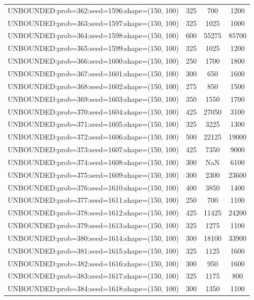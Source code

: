 \begin{longtable}{lccc}
UNBOUNDED:prob=362:seed=1596:shape=(150, 100) &      325 &   700 &   1200 \\
UNBOUNDED:prob=363:seed=1597:shape=(150, 100) &      325 &  1025 &   1000 \\
UNBOUNDED:prob=364:seed=1598:shape=(150, 100) &      600 & 55275 &  85700 \\
UNBOUNDED:prob=365:seed=1599:shape=(150, 100) &      325 &  1025 &   1200 \\
UNBOUNDED:prob=366:seed=1600:shape=(150, 100) &      250 &  1700 &   1800 \\
UNBOUNDED:prob=367:seed=1601:shape=(150, 100) &      300 &   650 &   1600 \\
UNBOUNDED:prob=368:seed=1602:shape=(150, 100) &      275 &   850 &   1500 \\
UNBOUNDED:prob=369:seed=1603:shape=(150, 100) &      350 &  1550 &   1700 \\
UNBOUNDED:prob=370:seed=1604:shape=(150, 100) &      425 & 27050 &   3100 \\
UNBOUNDED:prob=371:seed=1605:shape=(150, 100) &      325 &  3225 &   1300 \\
UNBOUNDED:prob=372:seed=1606:shape=(150, 100) &      500 & 22125 &  19000 \\
UNBOUNDED:prob=373:seed=1607:shape=(150, 100) &      425 &  7350 &   9000 \\
UNBOUNDED:prob=374:seed=1608:shape=(150, 100) &      300 &   NaN &   6100 \\
UNBOUNDED:prob=375:seed=1609:shape=(150, 100) &      300 &  2300 &  23600 \\
UNBOUNDED:prob=376:seed=1610:shape=(150, 100) &      400 &  3850 &   1400 \\
UNBOUNDED:prob=377:seed=1611:shape=(150, 100) &      250 &   700 &   1100 \\
UNBOUNDED:prob=378:seed=1612:shape=(150, 100) &      425 & 11425 &  24200 \\
UNBOUNDED:prob=379:seed=1613:shape=(150, 100) &      325 &  1275 &   1100 \\
UNBOUNDED:prob=380:seed=1614:shape=(150, 100) &      300 & 18100 &  33900 \\
UNBOUNDED:prob=381:seed=1615:shape=(150, 100) &      325 &  1125 &   1600 \\
UNBOUNDED:prob=382:seed=1616:shape=(150, 100) &      300 &   950 &   1600 \\
UNBOUNDED:prob=383:seed=1617:shape=(150, 100) &      325 &  1175 &    800 \\
UNBOUNDED:prob=384:seed=1618:shape=(150, 100) &      300 &  1350 &   1100 \\

\end{longtable}
